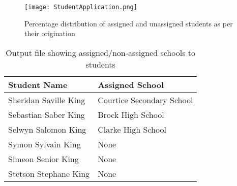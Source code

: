 \documentclass[twocolumn]{bmcart}
\begin{document}
		\begin{figure}[h!]
			\centering
			\texttt{[image: StudentApplication.png]}
			\caption{Percentage distribution of assigned and unassigned students as per their origination}
			\label{fig:allocation}
		\end{figure}
		
		{\small
			\begin{table}[h!]
				\centering
				\small
				\caption{Output file showing assigned/non-assigned schools to students}
				\label{table:review}
				\begin{tabular}{| p{3cm}| p{3cm}| }
					\hline
					Student Name & Assigned School \\ \hline
					
					Sheridan Saville King & Courtice Secondary School\\\hline
					
					Sebastian Saber King & Brock High School\\\hline
					
					Selwyn Salomon King & Clarke High School\\\hline
					
					Symon Sylvain King & None\\\hline
					
					Simeon Senior King & None\\\hline
					
					Stetson Stephane King & None\\\hline
					
					
				\end{tabular}%
			\end{table}%
		}
\end{document}
